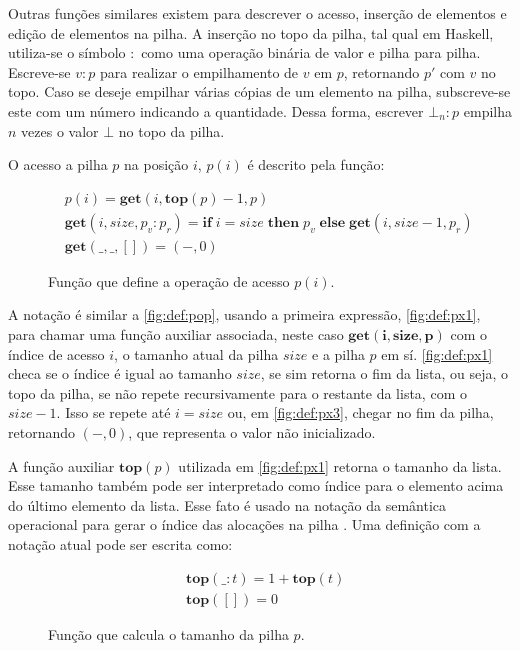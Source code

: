 Outras funções similares existem para descrever o acesso, inserção de elementos e edição de elementos na pilha. A inserção no topo da pilha, tal qual em Haskell, utiliza-se o símbolo $:$ como uma operação binária de valor e pilha para pilha. Escreve-se $v : p$ para realizar o empilhamento de $v$ em $p$, retornando $p'$ com $v$ no topo. Caso se deseje empilhar várias cópias de um elemento na pilha, subscreve-se este com um número indicando a quantidade. Dessa forma, escrever $\bot_n : p$ empilha $n$ vezes o valor $\bot$ no topo da pilha. 

O acesso a pilha $p$ na posição $i$, $p(i)$ é descrito pela função:

\begin{figure}[ht]
	\begin{align}
	&p(i) = \mathbf{get}(i, \mathbf{top}(p) - 1, p) \label{fig:def:px1}\\
	&\mathbf{get}(i, size, p_v : p_r) = \mathbf{if}\;i = size \;\mathbf{then}\;p_v\;\mathbf{else}\;\mathbf{get}(i, size - 1, p_r) \label{fig:def:px2}\\
	&\mathbf{get}(\_, \_, []) = (-,0) \label{fig:def:px3}
	\end{align}
	\caption{Função que define a operação de acesso $p(i)$.}
	\label{fig:def:px}
\end{figure}

A notação é similar a \ref{fig:def:pop}, usando a primeira expressão, \ref{fig:def:px1}, para chamar uma função auxiliar associada, neste caso $\mathbf{get(i, size, p)}$ com o índice de acesso $i$, o tamanho atual da pilha $size$ e a pilha $p$ em sí. \ref{fig:def:px1} checa se o índice é igual ao tamanho $size$, se sim retorna o fim da lista, ou seja, o topo da pilha, se não repete recursivamente para o restante da lista, com o $size - 1$. Isso se repete até $i = size$ ou, em \ref{fig:def:px3}, chegar no fim da pilha, retornando $(-,0)$, que representa o valor não inicializado.

A função auxiliar $\mathbf{top}(p)$ utilizada em \ref{fig:def:px1} retorna o tamanho da lista. Esse tamanho também pode ser interpretado como índice para o elemento acima do último elemento da lista. Esse fato é usado na notação da semântica operacional para gerar o índice das alocações na pilha . Uma definição com a notação atual pode ser escrita como:

\begin{figure}[ht]
	\begin{align}
	&\mathbf{top}(\_ : t) = 1 + \mathbf{top}(t) \label{fig:def:top1}\\
	&\mathbf{top}([]) = 0 \label{fig:def:top2}
	\end{align}
	\caption{Função que calcula o tamanho da pilha $p$.}
	\label{fig:def:top}
\end{figure}

